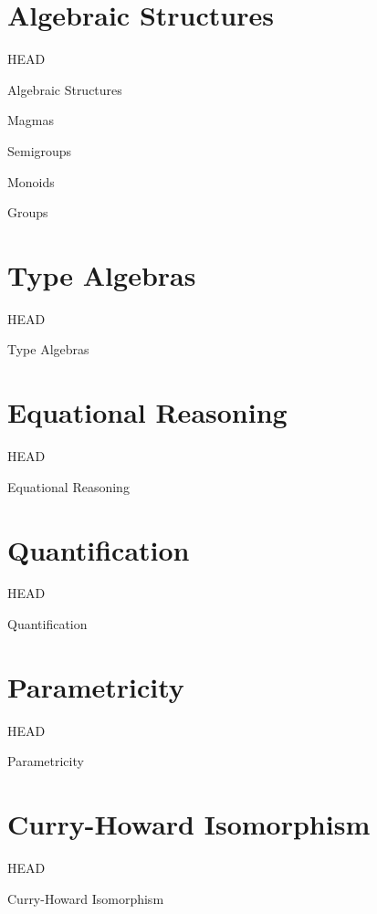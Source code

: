 \documentclass[presentation,14pt]{beamer}
\newcommand{\head}[1]{\begin{center}
\vspace{13mm}\hspace{-1mm}\Huge{{#1}}
\end{center}}
\begin{document}
\section{Algebraic Structures}
\label{sec-5}
\begin{frame}[fragile,plain,label=sec-5-1]{HEAD}
\head{Algebraic Structures}
\end{frame}
\begin{frame}[fragile,label=sec-5-2]{Magmas}
\end{frame}
\begin{frame}[fragile,label=sec-5-3]{Semigroups}
\end{frame}
\begin{frame}[fragile,label=sec-5-4]{Monoids}
\end{frame}
\begin{frame}[fragile,label=sec-5-5]{Groups}
\end{frame}
\section{Type Algebras}
\label{sec-6}
\begin{frame}[fragile,plain,label=sec-6-1]{HEAD}
\head{Type Algebras}
\end{frame}
\section{Equational Reasoning}
\label{sec-7}
\begin{frame}[fragile,plain,label=sec-7-1]{HEAD}
\head{Equational Reasoning}
\end{frame}
\section{Quantification}
\label{sec-8}
\begin{frame}[fragile,plain,label=sec-8-1]{HEAD}
\head{Quantification}
\end{frame}
\section{Parametricity}
\label{sec-9}
\begin{frame}[fragile,plain,label=sec-9-1]{HEAD}
\head{Parametricity}
\end{frame}
\section{Curry-Howard Isomorphism}
\label{sec-10}
\begin{frame}[fragile,plain,label=sec-10-1]{HEAD}
\head{Curry-Howard Isomorphism}
\end{frame}
\end{document}
